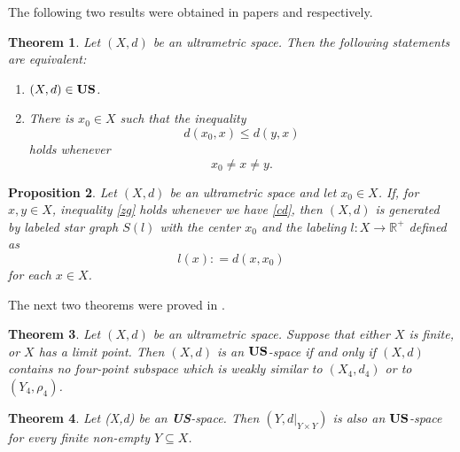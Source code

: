\documentclass[11pt]{article}
\newtheorem{theorem}{Theorem}[section]
\newtheorem{proposition}[theorem]{Proposition}
\theoremstyle{definition}
\theoremstyle{remark}
\numberwithin{equation}{section}
\begin{document}
The following two results were obtained  in papers \cite{DR2025USGbLSG} and \cite{DCR2025OJAC} respectively.


\begin{theorem}\label{[2.1]}
Let $(X,d)$ be an ultrametric space. Then the following statements are equivalent:
\begin{enumerate}
\item[(i)]  $(X,d) \in {\bf US}$.
\item[(i)]  There is $x_{0} \in X$ such that the inequality
    \begin{equation}\label{zg}
        d(x_{0},x) \leq d(y,x) 
        \end{equation}
    holds whenever
    \begin{equation}\label{cd}     
        x_{0} \neq x \neq y. 
        \end{equation}
\end{enumerate}
\end{theorem}



\begin{proposition}\label{fraas}
Let $(X,d)$ be an ultrametric space and let $x_0 \in X$. If, for $x,y \in X$, inequality \eqref{zg} holds whenever we have \eqref{cd}, then $(X,d)$ is generated by labeled star graph $S(l)$ with the center $x_0$ and the labeling $l: X \to \mathbb{R}^+$ defined as
\begin{equation*}
 l(x): = d(x,x_0)
\end{equation*}
for each $x \in X$.
\end{proposition}



The next two theorems were proved in \cite{DCR2025OJAC}.


\begin{theorem}
\label{eeerlm}
Let $(X,d)$ be an ultrametric space. Suppose that either $X$ is finite, or $X$ has a limit point. Then $(X,d)$ is an $ {\bf US}$-space if and only if $(X,d)$ contains no four-point subspace which is weakly similar to $(X_4,d_4)$ or to $(Y_4,\rho_4)$.
\end{theorem}


\begin{theorem}
\label{8866gh}
Let (X,d) be an {\bf US}-space.
Then $(Y, d|_{Y \times Y})$ is also an ${\bf US}$-space for every finite non-empty $Y \subseteq X$.
\end{theorem}




\end{document}
